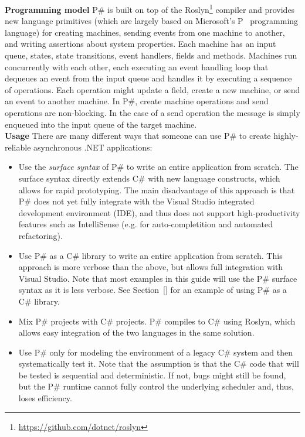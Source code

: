 \documentclass{llncs}
\newcommand{\ps}{P\#\xspace}
\newcommand{\cs}{C\#\xspace}
\newcommand{\newparagraph}[1]{\smallskip\noindent\textbf{#1 }}
\begin{document}
\newparagraph{Programming model} \ps is built on top of the Roslyn\footnote{\url{https://github.com/dotnet/roslyn}} compiler and provides new language primitives (which are largely based on Microsoft's P~\cite{desai2013p} programming language) for creating machines, sending events from one machine to another, and writing assertions about system properties. Each machine has an input queue, states, state transitions, event handlers, fields and methods. Machines run concurrently with each other, each executing an event handling loop that dequeues an event from the input queue and handles it by executing a sequence of operations. Each operation might update a field, create a new machine, or send an event to another machine. In \ps, create machine operations and send operations are non-blocking. In the case of a send operation the message is simply enqueued into the input queue of the target machine.\\

\newparagraph{Usage} There are many different ways that someone can use \ps to create highly-reliable asynchronous .NET applications:

\begin{itemize}
\item Use the \emph{surface syntax} of \ps to write an entire application from scratch. The surface syntax directly extends \cs with new language constructs, which allows for rapid prototyping. The main disadvantage of this approach is that \ps does not yet fully integrate with the Visual Studio integrated development environment (IDE), and thus does not support high-productivity features such as IntelliSense (e.g. for auto-completition and automated refactoring).

\item Use \ps as a \cs library to write an entire application from scratch. This approach is more verbose than the above, but allows full integration with Visual Studio. Note that most examples in this guide will use the \ps surface syntax as it is less verbose. See Section~\ref{} for an example of using \ps as a \cs library.

\item Mix \ps projects with \cs projects. \ps compiles to \cs using Roslyn, which allows easy integration of the two languages in the same solution.

\item Use \ps only for modeling the environment of a legacy \cs system and then systematically test it. Note that the assumption is that the \cs code that will be tested is sequential and deterministic. If not, bugs might still be found, but the \ps runtime cannot fully control the underlying scheduler and, thus, loses efficiency.
\end{itemize}
\end{document}

